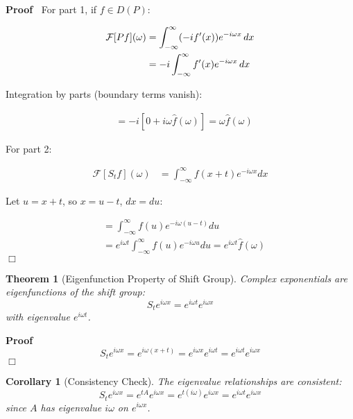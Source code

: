 \documentclass{article}
\newenvironment{proof}{\noindent\textbf{Proof\ }}{\hspace*{\fill}$\Box$\medskip}
\newtheorem{corollary}{Corollary}
\newtheorem{theorem}{Theorem}
\begin{document}
\begin{proof}
  For part 1, if $f \in D (P)$:
  
  \begin{align}
    \mathcal{F} [Pf] (\omega) & = \int_{- \infty}^{\infty} (- if' (x)) e^{- i
    \omega x}  \hspace{0.17em} dx \\
    & = - i \int_{- \infty}^{\infty} f' (x) e^{- i \omega x}  \hspace{0.17em}
    dx 
  \end{align}
  
  Integration by parts (boundary terms vanish):
  
  \begin{align}
    & = - i [0 + i \omega \hat{f} (\omega)] = \omega \hat{f} (\omega) 
  \end{align}
  
  For part 2:
  
  \begin{align}
    \mathcal{F} [S_t f] (\omega) & = \int_{- \infty}^{\infty} f (x + t) e^{- i
    \omega x} dx 
  \end{align}
  
  Let $u = x + t$, so $x = u - t$, $dx = du$:
  
  \begin{align}
    & = \int_{- \infty}^{\infty} f (u) e^{- i \omega (u - t)} du \\
    & = e^{i \omega t}  \int_{- \infty}^{\infty} f (u) e^{- i \omega u} du =
    e^{i \omega t}  \hat{f} (\omega) 
  \end{align}
\end{proof}

\begin{theorem}
  [Eigenfunction Property of Shift Group] Complex exponentials are
  eigenfunctions of the shift group:
  \[ S_t e^{i \omega x} = e^{i \omega t} e^{i \omega x} \]
  with eigenvalue $e^{i \omega t}$.
\end{theorem}

\begin{proof}
  \[ S_t e^{i \omega x} = e^{i \omega (x + t)} = e^{i \omega x} e^{i \omega t}
     = e^{i \omega t} e^{i \omega x} \]
\end{proof}

\begin{corollary}
  [Consistency Check] The eigenvalue relationships are consistent:
  \[ S_t e^{i \omega x} = e^{tA} e^{i \omega x} = e^{t (i \omega)} e^{i \omega
     x} = e^{i \omega t} e^{i \omega x} \]
  since $A$ has eigenvalue $i \omega$ on $e^{i \omega x}$.
\end{corollary}
\end{document}
